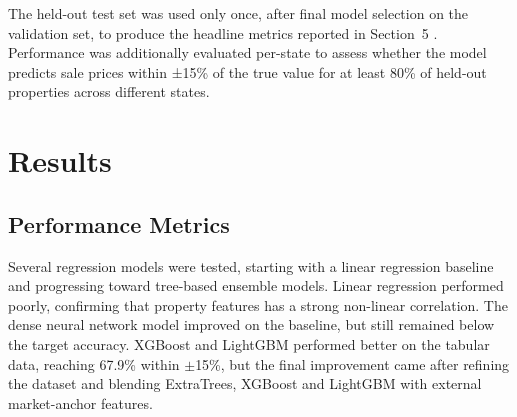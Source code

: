 \documentclass[a4paper,12pt]{article}
\begin{document}
The held-out test set was used only once, after final model selection 
on the validation set, to produce the headline metrics reported in 
Section~5 \cite{hastie2009esl}. Performance was additionally evaluated 
per-state to assess whether the model predicts sale prices within 
±15\% of the true value for at least 80\% of held-out properties 
across different states.


\section{Results}

\subsection{Performance Metrics}

Several regression models were tested, starting with a linear regression baseline and progressing toward tree-based ensemble models. Linear regression performed poorly, confirming that property features has a strong non-linear correlation. The dense neural network model improved on the baseline, but still remained below the target accuracy. XGBoost and LightGBM performed better on the tabular data, reaching 67.9\% within $\pm$15\%, but the final improvement came after refining the dataset and blending ExtraTrees, XGBoost and LightGBM with external market-anchor features.
\end{document}
